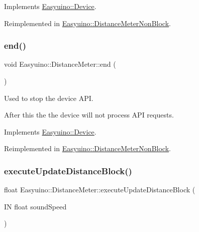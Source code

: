 Implements \hyperlink{class_easyuino_1_1_device_a2e7bb2fec849719a9d9432b57cdb72ba}{Easyuino\+::\+Device}.



Reimplemented in \hyperlink{class_easyuino_1_1_distance_meter_non_block_a46d2093d0fc125e98c3602868c088a77}{Easyuino\+::\+Distance\+Meter\+Non\+Block}.

\mbox{\label{class_easyuino_1_1_distance_meter_a8a818cc922418ae5a078193dbfab1e6b}} 
\subsubsection{\texorpdfstring{end()}{end()}}
{\footnotesize\ttfamily void Easyuino\+::\+Distance\+Meter\+::end (\begin{DoxyParamCaption}{ }\end{DoxyParamCaption})\hspace{0.3cm}{\ttfamily [virtual]}}



Used to stop the device A\+PI. 

After this the the device will not process A\+PI requests. 

Implements \hyperlink{class_easyuino_1_1_device_ab31018ef64adc84aa2ea575b2297548f}{Easyuino\+::\+Device}.



Reimplemented in \hyperlink{class_easyuino_1_1_distance_meter_non_block_a845d4db657ff408205d1cdb3c35982a4}{Easyuino\+::\+Distance\+Meter\+Non\+Block}.

\mbox{\label{class_easyuino_1_1_distance_meter_a4e02477669d61a3a7afb7deb9c53cf17}} 
\subsubsection{\texorpdfstring{execute\+Update\+Distance\+Block()}{executeUpdateDistanceBlock()}}
{\footnotesize\ttfamily float Easyuino\+::\+Distance\+Meter\+::execute\+Update\+Distance\+Block (\begin{DoxyParamCaption}\item[{IN float}]{sound\+Speed }\end{DoxyParamCaption})\hspace{0.3cm}{\ttfamily [protected]}}



